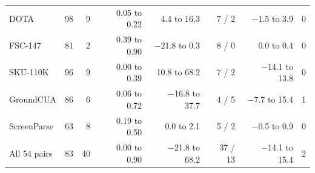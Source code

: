 \begin{table}[tp]
\begin{tabular}{@{}lrrrrrrr@{}}
DOTA & 98 & 9 & 0.05 to 0.22 & 4.4 to 16.3 & 7 / 2 & $-$1.5 to 3.9 & 0 \\
FSC-147 & 81 & 2 & 0.39 to 0.90 & $-$21.8 to 0.3 & 8 / 0 & 0.0 to 0.4 & 0 \\
SKU-110K & 96 & 9 & 0.00 to 0.39 & 10.8 to 68.2 & 7 / 2 & $-$14.1 to 13.8 & 0 \\
GroundCUA & 86 & 6 & 0.06 to 0.72 & $-$16.8 to 37.7 & 4 / 5 & $-$7.7 to 15.4 & 1 \\
ScreenParse & 63 & 8 & 0.19 to 0.50 & 0.0 to 2.1 & 5 / 2 & $-$0.5 to 0.9 & 0 \\
\midrule
All 54 pairs & 83 & 40 & 0.00 to 0.90 & $-$21.8 to 68.2 & 37 / 13 & $-$14.1 to 15.4 & 2 \\
\bottomrule\end{tabular}\end{table}

